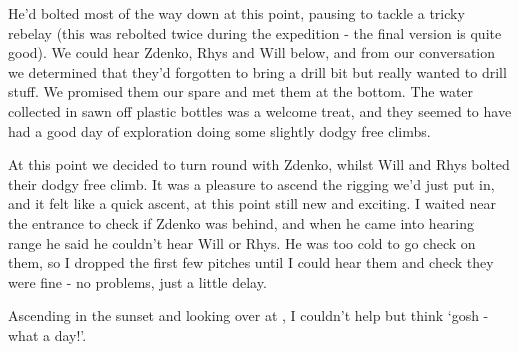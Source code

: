 He'd bolted most of the way down at this point, pausing to tackle a tricky rebelay (this was rebolted twice during the expedition - the final version is quite good). We could hear Zdenko, Rhys and Will below, and from our conversation we determined that they'd forgotten to bring a drill bit but really wanted to drill stuff. We promised them our spare and met them at the bottom. The water collected in sawn off plastic bottles was a welcome treat, and they seemed to have had a good day of exploration doing some slightly dodgy free climbs.

At this point we decided to turn round with Zdenko, whilst Will and Rhys bolted their dodgy free climb. It was a pleasure to ascend the rigging we'd just put in, and it felt like a quick ascent, at this point still new and exciting. I waited near the entrance to check if Zdenko was behind, and when he came into hearing range he said he couldn't hear Will or Rhys. He was too cold to go check on them, so I dropped the first few pitches until I could hear them and check they were fine - no problems, just a little delay.

Ascending in the sunset and looking over at , I couldn't help but think `gosh - what a day!'.



